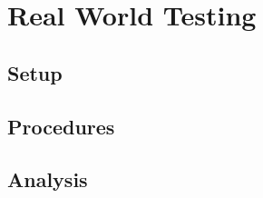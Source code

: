 \documentclass[../thesis.tex]{subfiles}
\begin{document}
\chapter{Real World Testing}

\section{Setup}

\section{Procedures}

\section{Analysis}
\end{document}
